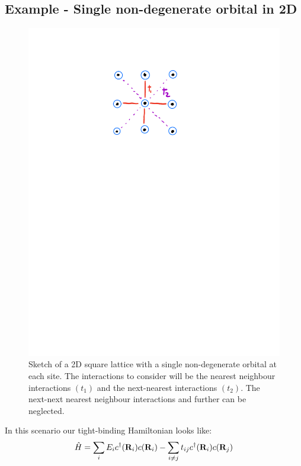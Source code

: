 \subsection{Example - Single non-degenerate orbital in 2D}
\begin{figure}[htbp]
    \centering
    \includegraphics[scale=0.7]{Images/fig-2dtightbindingsquarelattice.pdf}
    
    \caption{Sketch of a 2D square lattice with a single non-degenerate orbital at each site. The interactions to consider will be the nearest neighbour interactions $(t_1)$ and the next-nearest interactions $(t_2)$. The next-next nearest neighbour interactions and further can be neglected.}
    \label{fig-2dtightbindingsquarelattice}
\end{figure}
In this scenario our tight-binding Hamiltonian looks like:
\begin{equation}
    \hat{H} = \sum_i E_i c^\dagger(\mathbf{R}_i)c(\mathbf{R}_i) - \sum_{i \neq j}t_{ij}c^\dagger(\mathbf{R}_i)c(\mathbf{R}_j)
\end{equation}
